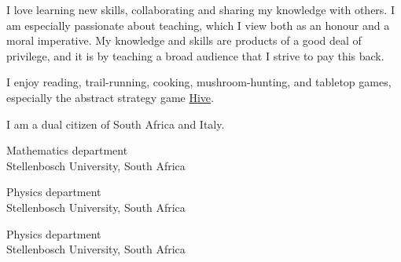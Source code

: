 \documentclass[10pt,a4paper,ragged2e,withhyper]{altacv}
\begin{document}
\begin{paracol}{2}
\medskip

I love learning new skills, collaborating and sharing my knowledge with others.
I am especially passionate about teaching, which I view both as an honour and a moral imperative.
My knowledge and skills are products of a good deal of privilege, and it is by teaching a broad audience that I
strive to pay this back.

\medskip

I enjoy reading, trail-running, cooking, mushroom-hunting, and tabletop games, especially the abstract strategy game
\href{https://github.com/dariotrinchero/hive}{Hive}.

\medskip

I am a dual citizen of South Africa and Italy.

\smallskip


\smallskip

{Mathematics department\\Stellenbosch University, South Africa}

\divider

{Physics department\\Stellenbosch University, South Africa}

\divider

{Physics department\\Stellenbosch University, South Africa}



\end{paracol}
\end{document}
